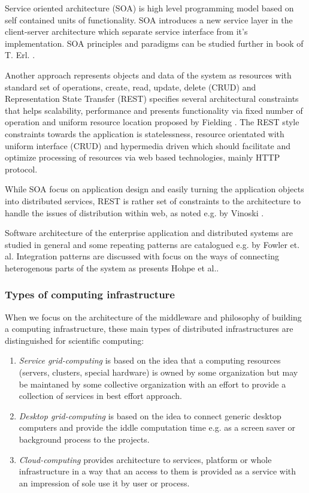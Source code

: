 Service oriented architecture (SOA) is high level programming model based on self contained units of functionality. SOA introduces a new service layer in the client-server architecture which separate service interface from it's implementation. SOA principles and paradigms can be studied further in book of T. Erl. \cite{Erl2008}. 

Another approach represents objects and data of the system as resources with standard set of operations, create, read, update, delete (CRUD) and Representation State Transfer (REST) specifies several architectural constraints that helps scalability, performance and presents functionality via fixed number of operation and uniform resource location proposed by Fielding \cite{fielding2000chapter}. The REST style constraints towards the application is statelessness, resource orientated with uniform interface (CRUD) and hypermedia driven which should facilitate and optimize processing of resources via web based technologies, mainly HTTP protocol. 

While SOA focus on application design and easily turning the application objects into distributed services, REST is rather set of constraints to the architecture to handle the issues of distribution within web, as noted e.g. by Vinoski \cite{Vinoski2007}.

Software architecture of the enterprise application and distributed systems are studied in general and some repeating patterns are catalogued e.g. by Fowler et. al\cite{Fowler2003}. Integration patterns are discussed with focus on the ways of connecting heterogenous parts of the system as presents Hohpe et al.\cite{Hohpe2002}.
\subsubsection{Types of computing infrastructure}
When we focus on the architecture of the middleware and philosophy of building a computing infrastructure, these main types of distributed infrastructures are distinguished for scientific computing:
\begin{enumerate}
\item{\emph{Service grid-computing} is based on the idea that a computing resources (servers, clusters, special hardware) is owned by some organization but may be maintaned by some collective organization with an effort to provide a collection of services in best effort approach.}
\item{\emph{Desktop grid-computing} is based on the idea to connect generic desktop computers and provide the iddle computation time e.g. as a screen saver or background process to the projects.}
\item{\emph{Cloud-computing} provides architecture to services, platform or whole infrastructure in a way that an access to them is provided as a service with an impression of sole use it by user or process.
}
\end{enumerate}


